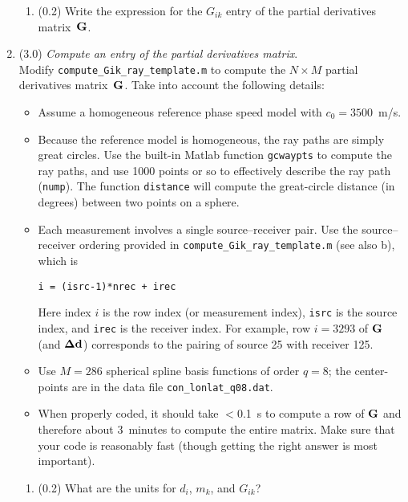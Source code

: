 \documentclass[11pt,titlepage,fleqn]{article}
\begin{document}
\begin{enumerate}
\begin{enumerate}
\item (0.2) Write the expression for the $G_{ik}$ entry of the partial derivatives matrix~$\mbox{${\bf G}$}$.
\end{enumerate}


\item (3.0) {\em Compute an entry of the partial derivatives matrix}. \\
Modify \verb+compute_Gik_ray_template.m+ to compute the $N \times M$ partial derivatives matrix~$\mbox{${\bf G}$}$.
Take into account the following details:
%
\begin{itemize}
\item Assume a homogeneous reference phase speed model with $c_0 = 3500$~m/s.

\item Because the reference model is homogeneous, the ray paths are simply great circles.  Use the built-in Matlab function \verb+gcwaypts+ to compute the ray paths, and use 1000 points or so to effectively describe the ray path (\verb+nump+). The function \verb+distance+ will compute the great-circle distance (in degrees) between two points on a sphere.

\item Each measurement involves a single source--receiver pair. Use the source--receiver ordering provided in \verb+compute_Gik_ray_template.m+ (see also b), which is
%
\begin{verbatim}
i = (isrc-1)*nrec + irec
\end{verbatim}
%
Here index $i$ is the row index (or measurement index), \verb+isrc+ is the source index, and \verb+irec+ is the receiver index.
For example, row $i=3293$ of $\mbox{${\bf G}$}$ (and $\mbox{\boldmath $\bf \Delta$}\mbox{${\bf d}$}$) corresponds to the pairing of source 25 with receiver 125.

\item Use $M=286$ spherical spline basis functions of order $q=8$; the center-points are in the data file \verb+con_lonlat_q08.dat+.

\item When properly coded, it should take $<$0.1~s to compute a row of $\mbox{${\bf G}$}$ and therefore about 3~minutes to compute the entire matrix. Make sure that your code is reasonably fast (though getting the right answer is most important).

\end{itemize}

\begin{enumerate}
\item (0.2) What are the units for $d_i$, $m_k$, and $G_{ik}$?


\end{enumerate}
\end{enumerate}
\end{document}
